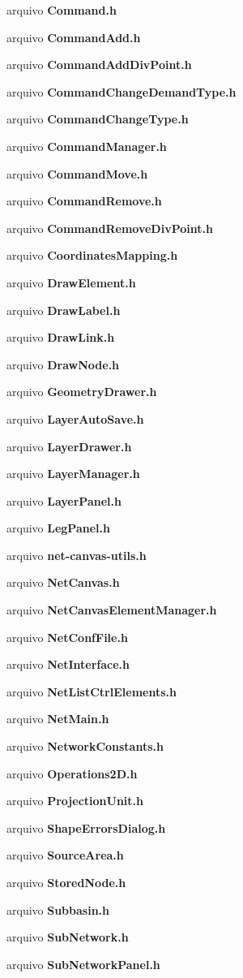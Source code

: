 \begin{DoxyCompactItemize}
\item 
arquivo {\bf Command.\+h}
\item 
arquivo {\bf Command\+Add.\+h}
\item 
arquivo {\bf Command\+Add\+Div\+Point.\+h}
\item 
arquivo {\bf Command\+Change\+Demand\+Type.\+h}
\item 
arquivo {\bf Command\+Change\+Type.\+h}
\item 
arquivo {\bf Command\+Manager.\+h}
\item 
arquivo {\bf Command\+Move.\+h}
\item 
arquivo {\bf Command\+Remove.\+h}
\item 
arquivo {\bf Command\+Remove\+Div\+Point.\+h}
\item 
arquivo {\bf Coordinates\+Mapping.\+h}
\item 
arquivo {\bf Draw\+Element.\+h}
\item 
arquivo {\bf Draw\+Label.\+h}
\item 
arquivo {\bf Draw\+Link.\+h}
\item 
arquivo {\bf Draw\+Node.\+h}
\item 
arquivo {\bf Geometry\+Drawer.\+h}
\item 
arquivo {\bf Layer\+Auto\+Save.\+h}
\item 
arquivo {\bf Layer\+Drawer.\+h}
\item 
arquivo {\bf Layer\+Manager.\+h}
\item 
arquivo {\bf Layer\+Panel.\+h}
\item 
arquivo {\bf Leg\+Panel.\+h}
\item 
arquivo {\bf net-\/canvas-\/utils.\+h}
\item 
arquivo {\bf Net\+Canvas.\+h}
\item 
arquivo {\bf Net\+Canvas\+Element\+Manager.\+h}
\item 
arquivo {\bf Net\+Conf\+File.\+h}
\item 
arquivo {\bf Net\+Interface.\+h}
\item 
arquivo {\bf Net\+List\+Ctrl\+Elements.\+h}
\item 
arquivo {\bf Net\+Main.\+h}
\item 
arquivo {\bf Network\+Constants.\+h}
\item 
arquivo {\bf Operations2\+D.\+h}
\item 
arquivo {\bf Projection\+Unit.\+h}
\item 
arquivo {\bf Shape\+Errors\+Dialog.\+h}
\item 
arquivo {\bf Source\+Area.\+h}
\item 
arquivo {\bf Stored\+Node.\+h}
\item 
arquivo {\bf Subbasin.\+h}
\item 
arquivo {\bf Sub\+Network.\+h}
\item 
arquivo {\bf Sub\+Network\+Panel.\+h}
\end{DoxyCompactItemize}
